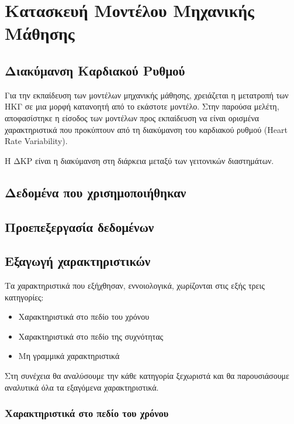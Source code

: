 
\section{Κατασκευή Μοντέλου Μηχανικής Μάθησης}{\label{machine_learning_model}}

\subsection{Διακύμανση Καρδιακού Ρυθμού}

Για την εκπαίδευση των μοντέλων μηχανικής μάθησης, χρειάζεται η μετατροπή των ΗΚΓ σε μια μορφή κατανοητή από το εκάστοτε μοντέλο. Στην παρούσα μελέτη, αποφασίστηκε η είσοδος των μοντέλων προς εκπαίδευση να είναι ορισμένα χαρακτηριστικά που προκύπτουν από τη διακύμανση του καρδιακού ρυθμού  (Heart Rate Variability).

Η ΔΚΡ είναι η διακύμανση στη διάρκεια μεταξύ των γειτονικών διαστημάτων.



\subsection{Δεδομένα που χρισημοποιήθηκαν}

\subsection{Προεπεξεργασία δεδομένων}

\subsection{Εξαγωγή χαρακτηριστικών}

Τα χαρακτηριστικά που εξήχθησαν, εννοιολογικά, χωρίζονται στις εξής τρεις κατηγορίες:
\begin{itemize}
    \item Χαρακτηριστικά στο πεδίο του χρόνου
    \item Χαρακτηριστικά στο πεδίο της συχνότητας
    \item Μη γραμμικά χαρακτηριστικά
\end{itemize}

Στη συνέχεια θα αναλύσουμε την κάθε κατηγορία ξεχωριστά και θα παρουσιάσουμε αναλυτικά όλα τα εξαγόμενα χαρακτηριστικά.

\subsubsection{Χαρακτηριστικά στο πεδίο του χρόνου}

